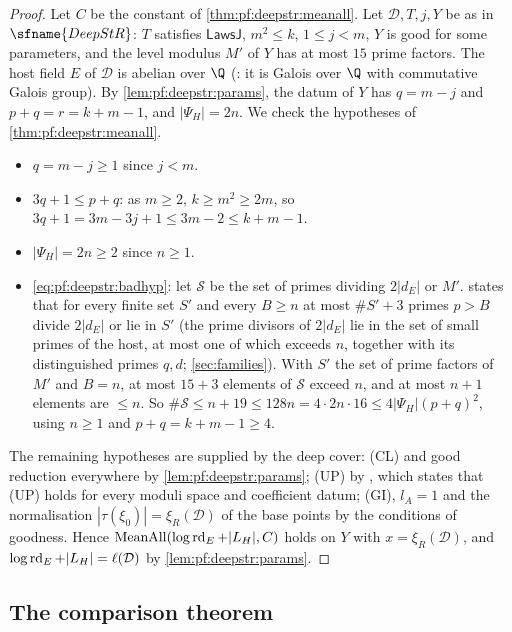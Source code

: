 \begin{proof}
Let $C$ be the constant of \cref{thm:pf:deepstr:meanall}. Let $\mathcal D,T,j,Y$ be as in $\sfname{DeepStR}$:
$T$ satisfies $\mathsf{LawsJ}$, $m^2\le k$, $1\le j<m$, $Y$ is good for some parameters, and the level modulus
$M'$ of $Y$ has at most $15$ prime factors. The host field $E$ of $\mathcal D$ is abelian over $\Q$
(: it is Galois over $\Q$ with commutative
Galois group). By \cref{lem:pf:deepstr:params}, the datum of $Y$ has $q=m-j$ and $p+q=r=k+m-1$, and
$|\Psi_H|=2n$. We check the hypotheses of \cref{thm:pf:deepstr:meanall}.
\begin{itemize}
\item $q=m-j\ge1$ since $j<m$.
\item $3q+1\le p+q$: as $m\ge2$, $k\ge m^2\ge2m$, so $3q+1=3m-3j+1\le3m-2\le k+m-1$.
\item $|\Psi_H|=2n\ge2$ since $n\ge1$.
\item \eqref{eq:pf:deepstr:badhyp}: let $\mathcal S$ be the set of primes dividing $2|d_E|$ or $M'$.
 states that for every finite set $S'$ and every
$B\ge n$ at most $\#S'+3$ primes $p>B$ divide $2|d_E|$ or lie in $S'$ (the prime divisors of $2|d_E|$ lie in the
set of small primes of the host, at most one of which exceeds $n$, together with its distinguished primes
$q,d$; \cref{sec:families}). With $S'$ the set of prime factors of $M'$ and $B=n$, at most $15+3$ elements of
$\mathcal S$ exceed $n$, and at most $n+1$ elements are $\le n$. So
$\#\mathcal S\le n+19\le128n=4\cdot2n\cdot16\le4|\Psi_H|(p+q)^2$, using $n\ge1$ and $p+q=k+m-1\ge4$.
\end{itemize}
The remaining hypotheses are supplied by the deep cover: (CL) and good reduction everywhere by
\cref{lem:pf:deepstr:params}; (UP) by , which
states that (UP) holds for every moduli space and coefficient datum; (GI), $l_A=1$ and the normalisation
$|\tau(\xi_0)|=\xi_R(\mathcal D)$ of the base points by the conditions of goodness. Hence
$\operatorname{MeanAll}(\log\operatorname{rd}_E+|L_H|,C)$ holds on $Y$ with $x=\xi_R(\mathcal D)$, and
$\log\operatorname{rd}_E+|L_H|=\ell(\mathcal D)$ by \cref{lem:pf:deepstr:params}.
\end{proof}

\subsection{The comparison theorem}\label{sec:pf:deepstr:comparison}

